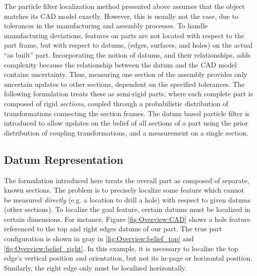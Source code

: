\documentclass[letterpaper, 10 pt, conference]{ieeeconf}
\begin{document}
The particle filter localization method presented above assumes that the object matches its CAD model exactly. 
However, this is usually not the case, due to tolerances in the manufacturing and assembly processes.
To handle manufacturing deviations, features on parts are not located with respect to the part frame, but with respect to datums, (edges, surfaces, and holes) on the actual ``as built'' part. Incorporating the notion of datums, and their relationships, adds complexity because the relationship between the datum and the CAD model contains uncertainty. Thus, measuring one section of the assembly provides only uncertain updates to other sections, dependent on the specified tolerances. 
The following formulation treats these as semi-rigid parts, where each complete part is composed of rigid \textit{sections}, coupled through a probabilistic distribution of transformations connecting the section frames.
The datum based particle filter is introduced to allow updates on the belief of all sections of a part using the prior distribution of coupling transformations, and a measurement on a single section.

\subsection{Datum Representation}

The formulation introduced here treats the overall part as composed of separate, known sections. 
The problem is to precisely localize some feature which cannot be measured \textit{directly} (e.g. a location to drill a hole) with respect to given datums (other sections). 
To localize the goal feature, certain datums must be localized in certain dimensions.
For instance, Figure \ref{fig:Overview:CAD} shows a hole feature referenced to the top and right edges datums of our part.
The true part configuration is shown in gray in \ref{fig:Overview:belief_top} and \ref{fig:Overview:belief_right}.
In this example, it is necessary to localize the top edge's vertical position and orientation, but not its in-page or horizontal position. 
Similarly, the right edge only must be localized horizontally.
\end{document}
